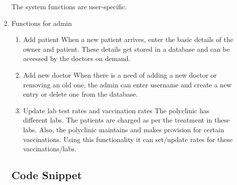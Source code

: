 \documentclass[oneside,a4paper,12pt]{book}
\begin{document}
\begin{appendices}
\begin{enumerate}
\begin{enumerate}
The system functions are user-specific.
\item Functions for admin
\begin{enumerate}[1.]
\item Add patient
When a new patient arrives, enter the basic details of the owner and patient. These details get stored in a database and can be accessed by the doctors on demand.
\item 	Add new doctor
When there is a need of adding a new doctor or removing an old one, the admin can enter username and create a new entry or delete one from the database.
\item Update lab test rates and vaccination rates
The polyclinic has different labs. The patients are charged as per the treatment in these labs.
	Also, the polyclinic maintains and makes provision for certain vaccinations.
	Using this functionality it can set/update rates for these vaccinations/labs.


\end{enumerate}
\newpage
\subsection{Code Snippet}
 \begin{center}
	\begin{figure}[!htbp]
		\centering
		
		
		

\end{figure}
\end{center}
\end{enumerate}
\end{enumerate}
\end{appendices}
\end{document}
